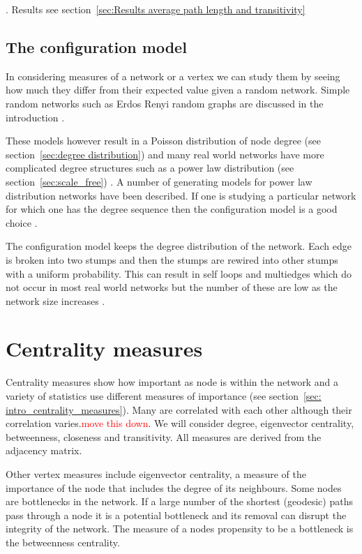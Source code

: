 . Results see section~\ref{sec:Results average path length and transitivity}

\subsection{The configuration model}
In considering measures of  a network or a vertex we can study them by seeing how much they differ from their expected value given a random network. Simple random networks such as Erdos Renyi random graphs are discussed in the introduction .

These models however result in a Poisson distribution of node degree (see section~\ref{sec:degree distribution})  and many real world networks have more complicated degree structures such as a power law distribution (see section~\ref{sec:scale_free}) . A number of generating models for power law distribution networks have been described. If one is studying a particular network for which one has the degree sequence then the configuration model is a good choice .

The configuration model keeps the degree distribution of the network. Each edge is broken into two stumps and then the stumps are rewired into other stumps with a uniform probability. This can result in self loops and multiedges which do not occur in most real world networks but the number of these are low as the network size increases \cite{newman2018networks}.




\section{Centrality measures}
Centrality measures show how important as node is within the network  and a variety of statistics use different measures of importance (see section~\ref{sec: intro_centrality_measures}). Many are correlated with each other although their correlation varies.\textcolor{red}{move this down}. We will consider degree, eigenvector centrality, betweenness, closeness and transitivity. All measures are derived from the adjacency matrix.



Other vertex measures include eigenvector centrality, a measure of the importance of the node that includes the degree of its neighbours. \cite{bonacich1987power}  Some nodes are bottlenecks in the network. If a large number of the shortest (geodesic) paths pass through a node it is a potential bottleneck and its removal can disrupt the integrity of the network. The measure of a nodes propensity to be a bottleneck is the betweenness centrality. \cite{freeman1977set} 


